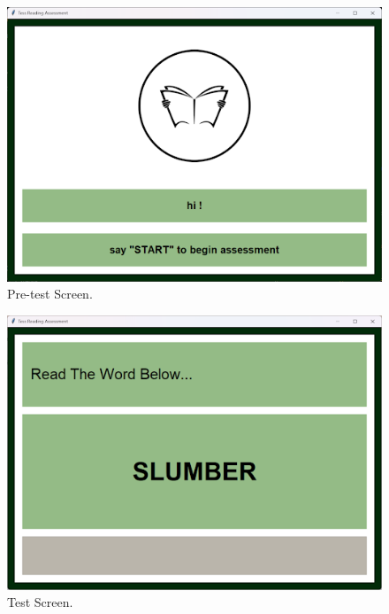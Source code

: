 \begin{figure}[!]
   \centering
   \includegraphics[scale = 0.6]{figures/Pre-test-Screen.png}
   \caption{Pre-test Screen.}
    \label{fig:pretestScreen}
\end{figure}

\begin{figure}[!]
   \centering
   \includegraphics[scale = 0.6]{figures/Test-Screen.png}
   \caption{Test Screen.}
    \label{fig:testScreen}
\end{figure}

